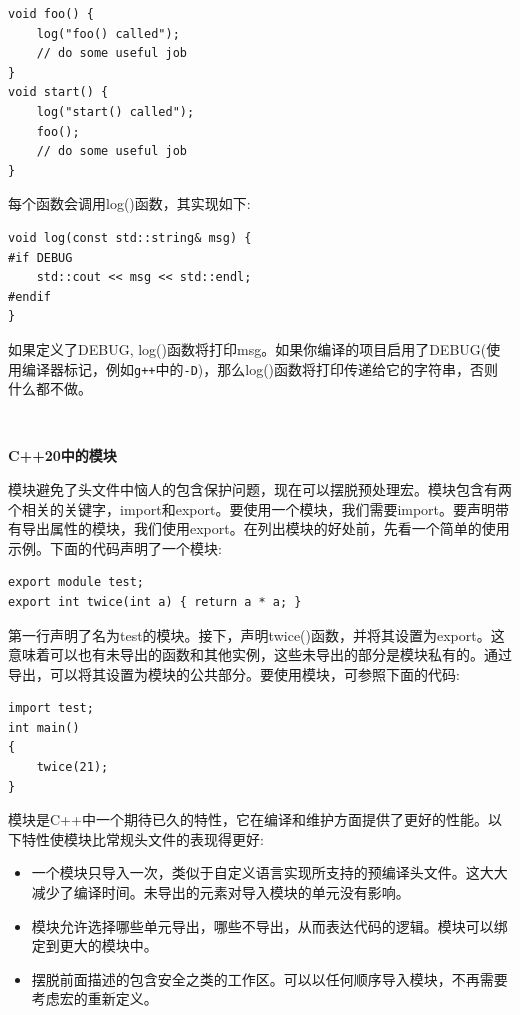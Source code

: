 \begin{lstlisting}[caption={}]
void foo() {
	log("foo() called");
	// do some useful job
}
void start() {
	log("start() called");
	foo();
	// do some useful job
}
\end{lstlisting}

每个函数会调用log()函数，其实现如下: \par

\begin{lstlisting}[caption={}]
void log(const std::string& msg) {
#if DEBUG
	std::cout << msg << std::endl;
#endif
}
\end{lstlisting}

如果定义了DEBUG, log()函数将打印msg。如果你编译的项目启用了DEBUG(使用编译器标记，例如\texttt{g++}中的\texttt{-D})，那么log()函数将打印传递给它的字符串，否则什么都不做。 \par

\noindent\textbf{}\ \par
\textbf{C++20中的模块}\ \par
模块避免了头文件中恼人的包含保护问题，现在可以摆脱预处理宏。模块包含有两个相关的关键字，import和export。要使用一个模块，我们需要import。要声明带有导出属性的模块，我们使用export。在列出模块的好处前，先看一个简单的使用示例。下面的代码声明了一个模块: \par

\begin{lstlisting}[caption={}]
export module test;
export int twice(int a) { return a * a; }
\end{lstlisting}

第一行声明了名为test的模块。接下，声明twice()函数，并将其设置为export。这意味着可以也有未导出的函数和其他实例，这些未导出的部分是模块私有的。通过导出，可以将其设置为模块的公共部分。要使用模块，可参照下面的代码: \par

\begin{lstlisting}[caption={}]
import test;
int main()
{
	twice(21);
}
\end{lstlisting}

模块是C++中一个期待已久的特性，它在编译和维护方面提供了更好的性能。以下特性使模块比常规头文件的表现得更好:\par

\begin{itemize}
	\item 一个模块只导入一次，类似于自定义语言实现所支持的预编译头文件。这大大减少了编译时间。未导出的元素对导入模块的单元没有影响。
	\item 模块允许选择哪些单元导出，哪些不导出，从而表达代码的逻辑。模块可以绑定到更大的模块中。
	\item 摆脱前面描述的包含安全之类的工作区。可以以任何顺序导入模块，不再需要考虑宏的重新定义。
\end{itemize}

